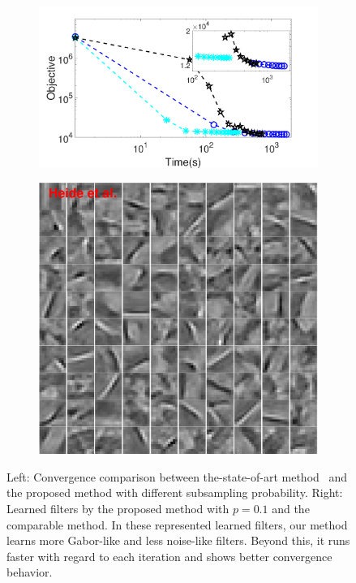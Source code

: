 \begin{figure}[h]
\begin{subfigure}{0.6\textwidth}
  \includegraphics[width=1\linewidth]{figure/timeVSobj.pdf}
\end{subfigure}
\begin{subfigure}{0.3\textwidth}
  \includegraphics[width=1\linewidth]{figure/heideFruit100.pdf}
\end{subfigure}

\caption{Left: Convergence comparison between the-state-of-art method~\cite{heide2015fast} and the proposed method with different subsampling probability. Right: Learned filters by the proposed method with $p=0.1$ and the comparable method. In these represented learned filters, our method learns more Gabor-like and less noise-like filters. Beyond this, it runs faster with regard to each iteration and shows better convergence behavior.}
\label{fig:subsampleResult}
\end{figure}

